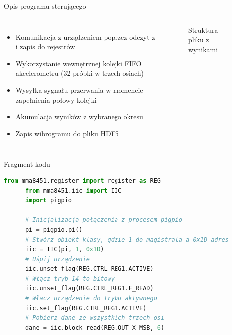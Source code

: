 \documentclass[aspectratio=1610,polish]{beamer} %
\begin{document}
  \begin{frame}{Opis programu sterującego}
    \begin{columns}
      \begin{itemize}
        \item Komunikacja z urządzeniem poprzez odczyt z i zapis do rejestrów
        \item Wykorzystanie wewnętrznej kolejki FIFO akcelerometru (32 próbki w trzech osiach)
        \item Wysyłka sygnału przerwania w momencie zapełnienia połowy kolejki
        \item Akumulacja wyników z wybranego okresu
        \item Zapis wibrogramu do pliku HDF5
      \end{itemize}
      \begin{figure}
      \begin{minipage}{\textwidth}
      \end{minipage}
      \caption{Struktura pliku z wynikami}
      \end{figure}
    \end{columns}
  \end{frame}
  \begin{frame}[fragile]{Fragment kodu}
    \begin{lstlisting}[language=Python]
      from mma8451.register import register as REG
      from mma8451.iic import IIC
      import pigpio
  
      # Inicjalizacja połączenia z procesem pigpio
      pi = pigpio.pi()
      # Stwórz obiekt klasy, gdzie 1 do magistrala a 0x1D adres
      iic = IIC(pi, 1, 0x1D)
      # Uśpij urządzenie
      iic.unset_flag(REG.CTRL_REG1.ACTIVE)
      # Włącz tryb 14-to bitowy
      iic.unset_flag(REG.CTRL_REG1.F_READ)
      # Włacz urządzenie do trybu aktywnego
      iic.set_flag(REG.CTRL_REG1.ACTIVE)
      # Pobierz dane ze wszystkich trzech osi
      dane = iic.block_read(REG.OUT_X_MSB, 6)\end{lstlisting}
  \end{frame}
\end{document}
